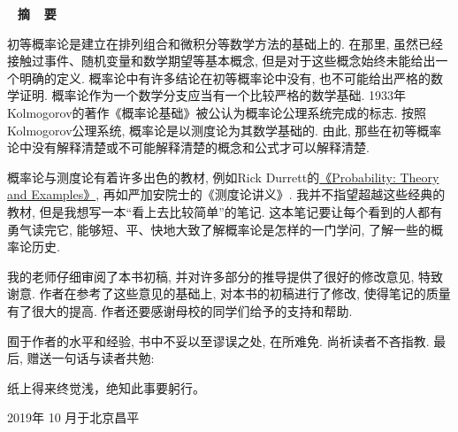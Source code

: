 \documentclass[12pt,UTF8]{ctexbook}
\newcommand{\kai}{\kaishu}
\newcommand{\BWKai}{\kai}
\theoremstyle{plain}
\numberwithin{equation}{chapter}
\numberwithin{algorithm}{chapter}
\begin{document}
\frontmatter
  

\clearpage{\cleardoublepage\pagestyle{empty}}
\vspace*{0.04\textheight}
\begin{center}\Large\
	\textbf{
		摘~~要\bigskip
	}
\end{center}

初等概率论是建立在排列组合和微积分等数学方法的基础上的. 在那里, 虽然已经接触过事件、随机变量和数学期望等基本概念, 但是对于这些概念始终未能给出一个明确的定义. 概率论中有许多结论在初等概率论中没有, 也不可能给出严格的数学证明. 概率论作为一个数学分支应当有一个比较严格的数学基础. 1933年Kolmogorov的著作《概率论基础》被公认为概率论公理系统完成的标志. 按照Kolmogorov公理系统, 概率论是以测度论为其数学基础的. 由此, 那些在初等概率论中没有解释清楚或不可能解释清楚的概念和公式才可以解释清楚.
	
	概率论与测度论有着许多出色的教材, 例如Rick Durrett的\href{https://services.math.duke.edu/~rtd/PTE/PTE5_011119.pdf}{《Probability: Theory and Examples》}, 再如严加安院士的《测度论讲义》. 我并不指望超越这些经典的教材, 但是我想写一本“看上去比较简单”的笔记. 这本笔记要让每个看到的人都有勇气读完它, 能够短、平、快地大致了解概率论是怎样的一门学问, 了解一些的概率论历史.

我的老师仔细审阅了本书初稿, 并对许多部分的推导提供了很好的修改意见, 特致谢意. 作者在参考了这些意见的基础上, 对本书的初稿进行了修改, 使得笔记的质量有了很大的提高. 作者还要感谢母校的同学们给予的支持和帮助.

囿于作者的水平和经验, 书中不妥以至谬误之处, 在所难免. 尚祈读者不吝指教. 最后, 赠送一句话与读者共勉:
\begin{center}
	{\BWKai\color{blue}
		纸上得来终觉浅，绝知此事要躬行。\bigskip
	}
\end{center}
\begin{flushright}
	{}
	
	2019年 10 月于北京昌平
\end{flushright}

\clearpage
{}
\tableofcontents

\mainmatter



%
%
%
%
%
%
%
%
%


\clearpage{\pagestyle{empty}\cleardoublepage}
%


%
%
%

\backmatter
{}

\end{document}
